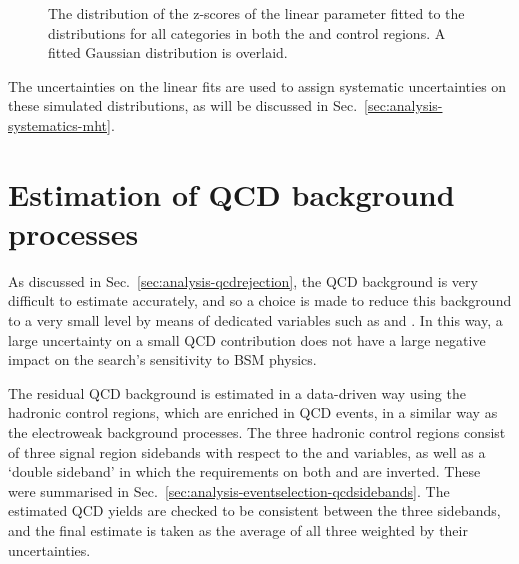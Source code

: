 \begin{figure}
\centering
{}
\caption{The distribution of the z-scores of the linear parameter fitted to the 
\mht distributions for all \njnbht categories in both the \mj and \mmj control 
regions. A fitted Gaussian distribution is overlaid.}
\label{fig:mhtvalidation-pulls}
\end{figure}

The uncertainties on the linear fits are used to assign systematic 
uncertainties on these simulated \mht distributions, as will be discussed in 
Sec.~\ref{sec:analysis-systematics-mht}.

\section{Estimation of QCD background processes}
\label{sec:analysis-estimation-qcd}
As discussed in Sec.~\ref{sec:analysis-qcdrejection}, the QCD background is 
very difficult to estimate accurately, and so a choice is made to reduce this 
background to a very small level by means of dedicated variables such as 
\alphat and \bdphi. In this way, a large uncertainty on a small QCD 
contribution does not have a large negative impact on the search's sensitivity 
to BSM physics. 

The residual QCD background is estimated in a data-driven way using the 
hadronic control regions, which are enriched in QCD events, in a similar way as 
the electroweak background processes. The three hadronic control regions 
consist of three signal region sidebands with respect to the \mhtmet and \bdphi 
variables, as well as a `double sideband' in which the requirements on both 
\mhtmet and \bdphi are inverted. These were summarised in 
Sec.~\ref{sec:analysis-eventselection-qcdsidebands}. The estimated QCD yields 
are checked to be consistent between the three sidebands, and the final 
estimate is taken as the average of all three weighted by their uncertainties.

